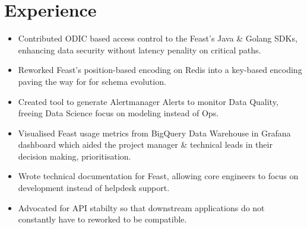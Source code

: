 %
%


\fancyhead{} %


\section{Experience}




\begin{itemize}
  \item Contributed ODIC based access control to the Feast's Java \& Golang
    SDKs, enhancing data security without latency penality on critical paths.
  \item Reworked Feast's position-based encoding on Redis into a key-based encoding 
    paving the way for for schema evolution.
  \item Created tool to generate Alertmanager Alerts to monitor Data Quality,
    freeing Data Science focus on modeling instead of Ops.
  \item Visualised Feast usage metrics from BigQuery Data Warehouse in Grafana dashboard
     which aided the project manager \& technical leads in their decision making, prioritisation.
  \item Wrote technical documentation for Feast, allowing core engineers to 
    focus on development instead of helpdesk support.
  \item Advocated for API stabilty so that downstream applications do not constantly
    have to reworked to be compatible.
\end{itemize}

